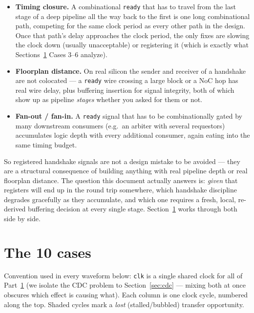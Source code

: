 \documentclass[12pt]{article}
\begin{document}
\begin{itemize}[leftmargin=1.4em]
  \item \textbf{Timing closure.} A combinational \texttt{ready} that has to
  travel from the last stage of a deep pipeline all the way back to the
  first is one long combinational path, competing for the same clock
  period as every other path in the design. Once that path's delay
  approaches the clock period, the only fixes are slowing the clock down
  (usually unacceptable) or registering it (which is exactly what
  Sections~\ref{sec:cases} Cases 3--6 analyze).
  \item \textbf{Floorplan distance.} On real silicon the sender and
  receiver of a handshake are not colocated — a \texttt{ready} wire
  crossing a large block or a NoC hop has real wire delay, plus buffering
  insertion for signal integrity, both of which show up as pipeline
  \emph{stages} whether you asked for them or not.
  \item \textbf{Fan-out / fan-in.} A \texttt{ready} signal that has to be
  combinationally gated by many downstream consumers (e.g.\ an arbiter
  with several requestors) accumulates logic depth with every additional
  consumer, again eating into the same timing budget.
\end{itemize}

So registered handshake signals are not a design mistake to be avoided —
they are a structural consequence of building anything with real pipeline
depth or real floorplan distance. The question this document actually
answers is: \emph{given} that registers will end up in the round trip
somewhere, which handshake discipline degrades gracefully as they
accumulate, and which one requires a fresh, local, re-derived buffering
decision at every single stage. Section~\ref{sec:cases} works through both
side by side.

\clearpage
\section{The 10 cases}
\label{sec:cases}

Convention used in every waveform below: \texttt{clk} is a single shared
clock for all of Part~\ref{sec:cases} (we isolate the CDC problem to
Section~\ref{sec:cdc} — mixing both at once obscures which effect is
causing what). Each column is one clock cycle, numbered along the top.
Shaded cycles mark a \emph{lost} (stalled/bubbled) transfer opportunity.
\end{document}
